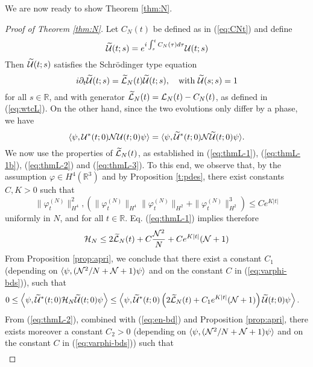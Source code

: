 \documentclass[11pt,a4paper]{article}
\newcommand{\cU}{{\cal U}}
\newcommand{\bR}{{\mathbb R}}
\newcommand{\wt}{\widetilde}
\newcommand{\cH}{{\cal H}}
\newcommand{\cL}{{\cal L}}
\newcommand{\cN}{{\cal N}}
\begin{document}
We are now ready to show Theorem \ref{thm:N}.

\begin{proof}[Proof of Theorem \ref{thm:N}]
Let $C_N (t)$ be defined as in (\ref{eq:CNt}) and define
\[ \wt{\cU} (t;s) = e^{i \int_s^t C_N (\tau) d\tau} \cU (t;s) \]
Then $\wt{\cU} (t;s)$ satisfies the Schr\"odinger type equation
\[ i\partial_t \wt{\cU} (t;s) = \wt{\cL}_N (t) \wt{\cU} (t;s), \quad \text{with } \wt{\cU} (s;s) = 1 \]
for all $s \in \bR$, and with generator $\wt{\cL}_N (t) = \cL_N (t) - C_N (t)$, as defined in (\ref{eq:wtcL}). On the other hand, since the two evolutions only differ by a phase, we have
\[ \langle \psi , \cU^* (t;0) \cN \cU (t;0) \psi \rangle = \langle \psi , \wt{\cU}^* (t;0) \cN \wt{\cU} (t;0) \psi \rangle. \]
We now use the properties of $\wt{\cL}_N(t)$, as established in (\ref{eq:thmL-1}), (\ref{eq:thmL-1b}), (\ref{eq:thmL-2}) and (\ref{eq:thmL-3}). To this end, we observe that, by the assumption $\varphi \in H^4 (\bR^3)$ and by Proposition \ref{t:pdes}, there exist constants $C,K > 0$ such that \begin{equation}\label{eq:varphi-bds}  \| \varphi_t^{(N)} \|_{H^4}^2 , \left(\| \varphi_t^{(N)} \|_{H^4} \| \varphi_t^{(N)} \|_{H^2} + \| \varphi_t^{(N)} \|_{H^2}^3 \right) \leq C e^{K |t|} \end{equation}
uniformly in $N$, and for all $t \in \bR$. Eq. (\ref{eq:thmL-1}) implies therefore 
\begin{equation}\label{eq:en-bd} \cH_N \leq 2 \wt{\cL}_N (t) + C \frac{\cN^2}{N} + C e^{K |t|} (\cN + 1) \end{equation}
{F}rom Proposition \ref{prop:apri}, we conclude that there exist a constant $C_1$ (depending on $\langle \psi , (\cN^2/ N + \cN + 1) \psi \rangle$ and on the constant $C$ in (\ref{eq:varphi-bds})), such that
\begin{equation}\label{eq:grw-1} \begin{split} 
0 \leq \Big\langle \psi , \wt{\cU}^* (t;0) &\cH_N \wt{\cU} (t;0) \psi \Big\rangle \leq \left\langle \psi , \wt{\cU}^* (t;0) \left( 2 \wt{\cL}_N (t) + C_1 e^{K|t|} (\cN + 1) \right) \wt{\cU} (t;0) \psi \right\rangle. \end{split} \end{equation}
{F}rom (\ref{eq:thmL-2}), combined with (\ref{eq:en-bd}) and Proposition \ref{prop:apri}, there exists moreover a constant $C_2 > 0$ (depending on $\langle \psi , (\cN^2/ N + \cN + 1) \psi \rangle$ and on the constant $C$ in (\ref{eq:varphi-bds})) such that
\[ \begin{split} 

\end{split}\]
\end{proof}
\end{document}
